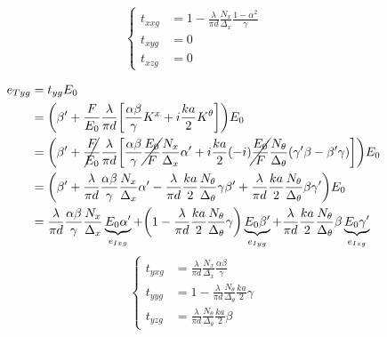 \begin{equation}
    \left\lbrace
    \begin{aligned}
        t_{xxg}
        &= 1
           -
           \frac{\lambda}{\pi d}
           \frac{N_x}{\Delta_x}
           \frac{1 - \alpha^2}{\gamma}
        \\
        t_{xyg} &= 0
        \\
        t_{xzg} &= 0
    \end{aligned}
    \right.
\end{equation}

\begin{align*}
    e_{\T yg} &= t_{yg} E_0
    \\
    &=
    \left(
        \beta'
        +
        \frac{F}{E_0}
        \frac{\lambda}{\pi d}
        \left[
            \frac{\alpha \beta}{\gamma}
            K^x
            +
            i
            \frac{ka}{2}
            K^\theta
        \right]
    \right)
    E_0
    \\
    &=
    \left(
        \beta'
        +
        \cancel{\frac{F}{E_0}}
        \frac{\lambda}{\pi d}
        \left[
            \frac{\alpha \beta}{\gamma}
            \cancel{\frac{E_0}{F}}
            \frac{N_x}{\Delta_x}
            \alpha'
            +
            i
            \frac{ka}{2}
            (-i)
            \cancel{\frac{E_0}{F}}
            \frac{N_\theta}{\Delta_\theta}
            (\gamma' \beta - \beta' \gamma)
        \right]
    \right)
    E_0
    \\
    &=
    \left(
        \beta'
        +
        \frac{\lambda}{\pi d}
        \frac{\alpha \beta}{\gamma}
        \frac{N_x}{\Delta_x}
        \alpha'
        -
        \frac{\lambda}{\pi d}
        \frac{ka}{2}
        \frac{N_\theta}{\Delta_\theta}
        \gamma
        \beta'
        +
        \frac{\lambda}{\pi d}
        \frac{ka}{2}
        \frac{N_\theta}{\Delta_\theta}
        \beta
        \gamma'
    \right)
    E_0
    \\
    &=
    \frac{\lambda}{\pi d}
    \frac{\alpha \beta}{\gamma}
    \frac{N_x}{\Delta_x}
    \underbrace{E_0 \alpha'}_{e_{\I xg}}
    +
    \left(
        1
        -
        \frac{\lambda}{\pi d}
        \frac{ka}{2}
        \frac{N_\theta}{\Delta_\theta}
        \gamma
    \right)
    \underbrace{E_0 \beta'}_{e_{\I yg}}
    +
    \frac{\lambda}{\pi d}
    \frac{ka}{2}
    \frac{N_\theta}{\Delta_\theta}
    \beta
    \underbrace{E_0 \gamma'}_{e_{\I zg}}
\end{align*}
\begin{equation}
    \left\lbrace
    \begin{aligned}
        t_{yxg}
        &= \frac{\lambda}{\pi d}
           \frac{N_x}{\Delta_x}
           \frac{\alpha \beta}{\gamma}
        \\
        t_{yyg}
        &= 1
           -
           \frac{\lambda}{\pi d}
           \frac{N_\theta}{\Delta_\theta}
           \frac{ka}{2}
           \gamma
        \\
        t_{yzg}
        &= \frac{\lambda}{\pi d}
           \frac{N_\theta}{\Delta_\theta}
           \frac{ka}{2}
           \beta
    \end{aligned}
    \right.
\end{equation}

